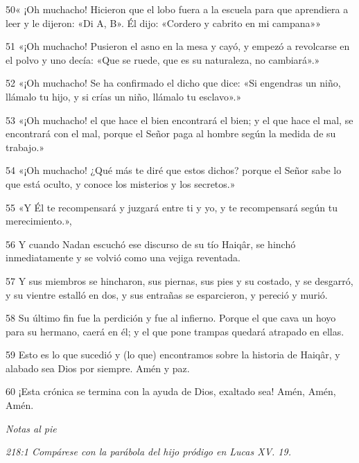 \par 50« ¡Oh muchacho! Hicieron que el lobo fuera a la escuela para que aprendiera a leer y le dijeron: «Di A, B». Él dijo: «Cordero y cabrito en mi campana»»

\par 51 «¡Oh muchacho! Pusieron el asno en la mesa y cayó, y empezó a revolcarse en el polvo y uno decía: «Que se ruede, que es su naturaleza, no cambiará».»

\par 52 «¡Oh muchacho! Se ha confirmado el dicho que dice: «Si engendras un niño, llámalo tu hijo, y si crías un niño, llámalo tu esclavo».»

\par 53 «¡Oh muchacho! el que hace el bien encontrará el bien; y el que hace el mal, se encontrará con el mal, porque el Señor paga al hombre según la medida de su trabajo.»

\par 54 «¡Oh muchacho! ¿Qué más te diré que estos dichos? porque el Señor sabe lo que está oculto, y conoce los misterios y los secretos.»

\par 55 «Y Él te recompensará y juzgará entre ti y yo, y te recompensará según tu merecimiento.»,

\par 56 Y cuando Nadan escuchó ese discurso de su tío Haiqâr, se hinchó inmediatamente y se volvió como una vejiga reventada.

\par 57 Y sus miembros se hincharon, sus piernas, sus pies y su costado, y se desgarró, y su vientre estalló en dos, y sus entrañas se esparcieron, y pereció y murió.

\par 58 Su último fin fue la perdición y fue al infierno. Porque el que cava un hoyo para su hermano, caerá en él; y el que pone trampas quedará atrapado en ellas.

\par 59 Esto es lo que sucedió y (lo que) encontramos sobre la historia de Haiqâr, y alabado sea Dios por siempre. Amén y paz.

\par 60 ¡Esta crónica se termina con la ayuda de Dios, exaltado sea! Amén, Amén, Amén.

\par \textit{Notas al pie}

\par \textit{218:1 Compárese con la parábola del hijo pródigo en Lucas XV. 19.}


